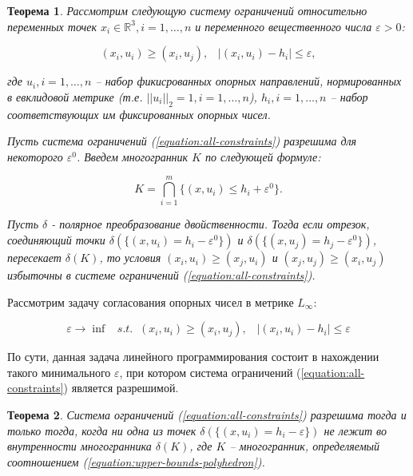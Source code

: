 \documentclass[a4paper, 10pt]{article}
\theoremstyle{definition}
\theoremstyle{plain}
\newtheorem{SmartTheorem}{Теорема}
\theoremstyle{plain}
\begin{document}
\begin{SmartTheorem}\label{theorem:exhaustive-conditions}
Рассмотрим следующую систему ограничений относительно переменных точек
$x_i \in \mathbb{R}^{3}, i = 1, \ldots, n$ и переменного вещественного числа
$\varepsilon > 0$:

\begin{equation}
\label{equation:all-constraints}
 (x_{i}, u_{i}) \geq (x_{i}, u_{j}), \;\;\;
 |(x_{i}, u_{i}) - h_{i}| \leq \varepsilon,
\end{equation}

где $u_i, i = 1, \ldots, n$ -- набор фикисрованных опорных направлений,
нормированных в евклидовой метрике (т.е. $||u_i||_{2} = 1, i = 1, \ldots, n$),
$h_i, i = 1 , \ldots, n$ -- набор соответствующих им фиксированных опорных
чисел.

Пусть система ограничений (\ref{equation:all-constraints}) разрешима
для некоторого $\varepsilon^{0}$. Введем многогранник $K$ по следующей формуле:

\begin{equation}
\label{equation:upper-bounds-polyhedron}
 K = \bigcap \limits_{i = 1}^{m}\{(x, u_{i}) \leq h_{i} + \varepsilon^{0}\}.
\end{equation}

Пусть $\delta$ - полярное преобразование двойственности.
Тогда если отрезок, соединяющий точки
$\delta(\{(x, u_{i}) = h_{i} - \varepsilon^{0}\})$ и
$\delta(\{(x, u_{j}) = h_{j} - \varepsilon^{0}\})$, пересекает
$\delta(K)$, то условия $(x_{i}, u_{i}) \geq (x_{j}, u_{i})$ и
$(x_{j}, u_{j}) \geq (x_{i}, u_{j})$ избыточны в системе ограничений
(\ref{equation:all-constraints}).
\end{SmartTheorem}

Рассмотрим задачу согласования опорных чисел в метрике $L_{\infty}$:

\begin{equation}
\label{equation:infinity-problem}
 \varepsilon \to \inf \;\;\;
 s. t. \;\; (x_{i}, u_{i}) \geq (x_{i}, u_{j}), \;\;\;
 |(x_{i}, u_{i}) - h_{i}| \leq \varepsilon
\end{equation}

По сути, данная задача линейного программирования состоит в нахождении такого
минимального $\varepsilon$, при котором система ограничений
(\ref{equation:all-constraints}) является разрешимой.

\begin{SmartTheorem}
 Система ограничений (\ref{equation:all-constraints}) разрешима тогда и только
 тогда, когда ни одна из точек
 $\delta(\{(x, u_{i}) = h_{i} - \varepsilon\})$ не лежит во внутренности
 многогранника $\delta(K)$, где $K$ -- многогранник, определяемый соотношением
 (\ref{equation:upper-bounds-polyhedron}).
\end{SmartTheorem}
\end{document}
